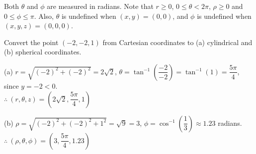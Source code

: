 

\vspace{6mm}

\par Both $\theta$ and $\phi$ are measured in radians.
Note that $r \ge 0$, $0 \le \theta < 2\pi$, $\rho \ge 0$ and $0 \le \phi \le \pi$.
Also, $\theta$ is undefined when $(x,y) = (0,0)$, and $\phi$ is undefined when $(x,y,z) = (0,0,0)$.
  
  
  
  
\begin{exa}
 Convert the point $(-2,-2,1)$ from Cartesian coordinates to (a) cylindrical and (b) spherical
 coordinates.\vspace{1.5mm}
 \end{exa}
 
 \begin{solu}
   (a) $r = \sqrt{(-2)^2 + (-2)^2} = 2\sqrt{2}$, $\theta =
 \tan^{-1} \left( \dfrac{-2}{-2} \right) = \tan^{-1}(1) = \dfrac{5 \pi}{4}$, since $y = -2 < 0$.\\
 $\therefore ~ (r,\theta,z) = \left( 2\sqrt{2},\dfrac{5 \pi}{4},1 \right)$\vspace{2mm}
 \par\noindent (b) $\rho = \sqrt{(-2)^2 + (-2)^2 + 1^2} = \sqrt{9} = 3$, $\phi = \cos^{-1} \left( \dfrac{1}{3} \right)
 \approx 1.23$ radians.\\
 $\therefore ~ (\rho,\theta,\phi) = \left( 3,\dfrac{5 \pi}{4}, 1.23 \right)$
 
 \end{solu}

